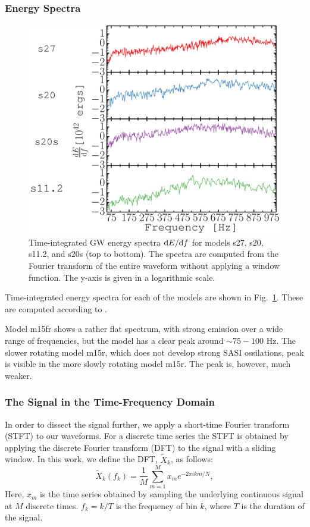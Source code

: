 \subsubsection{Energy Spectra}
\begin{figure}
\includegraphics[width=0.99\linewidth]{./images/chp1/fig2.pdf}
\caption{Time-integrated GW energy spectra $\mathrm{d} E/ \mathrm{d} f$ for models s27,
s20, s11.2, and s20s (top to bottom). The spectra
are computed from the Fourier transform of the entire waveform
without applying a window function. The y-axis is given in a logarithmic scale.
\label{fig:energy_spectra}}
\end{figure}
Time-integrated energy spectra for each of the models are shown
in Fig.~\ref{fig:energy_spectra}. These are computed according to .

Model m15fr shows a rather flat spectrum, with strong emission over a wide range of frequencies, but
the model has a clear peak around $\sim 75-100$ Hz. The slower rotating model m15r, which does not
develop strong SASI ossilations, 
peak is visible in the more slowly rotating model m15r. The peak is, however, much weaker.

\subsubsection{The Signal in the Time-Frequency Domain}
In order to dissect the signal further, we apply a short-time
Fourier transform (STFT) to our waveforms. For a discrete time series
the STFT is obtained by applying the discrete Fourier transform (DFT)
to the signal with a sliding window.
In this work, we define the DFT, $\widetilde{X}_k$, as follows: 
\begin{equation} \label{eq:DFT}
\widetilde{X}_k (f_k) = \frac{1}{M}  \sum^M_{m=1} x_m e^{-2\pi i k m/N},
\end{equation}
Here, $x_m$ is the time series obtained by sampling the underlying continuous signal at $M$ discrete times. 
$f_k = k/T$ is the frequency of bin $k$, where $T$ is the duration of the signal.

